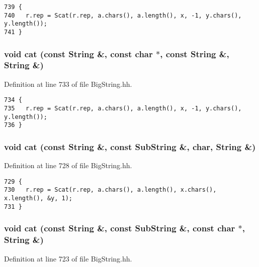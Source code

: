 \footnotesize\begin{verbatim}739 {
740   r.rep = Scat(r.rep, a.chars(), a.length(), x, -1, y.chars(), y.length());
741 }
\end{verbatim}\normalsize 
{}
\subsubsection{\setlength{\rightskip}{0pt plus 5cm}void cat (const String \&, const char $\ast$, const String \&, String \&)\hspace{0.3cm}{\tt  [friend]}}\label{classString_l21}




Definition at line 733 of file Big\-String.hh.



\footnotesize\begin{verbatim}734 {
735   r.rep = Scat(r.rep, a.chars(), a.length(), x, -1, y.chars(), y.length());
736 }
\end{verbatim}\normalsize 
{}
\subsubsection{\setlength{\rightskip}{0pt plus 5cm}void cat (const String \&, const {\bf Sub\-String} \&, char, String \&)\hspace{0.3cm}{\tt  [friend]}}\label{classString_l20}




Definition at line 728 of file Big\-String.hh.



\footnotesize\begin{verbatim}729 {
730   r.rep = Scat(r.rep, a.chars(), a.length(), x.chars(), x.length(), &y, 1);
731 }
\end{verbatim}\normalsize 
{}
\subsubsection{\setlength{\rightskip}{0pt plus 5cm}void cat (const String \&, const {\bf Sub\-String} \&, const char $\ast$, String \&)\hspace{0.3cm}{\tt  [friend]}}\label{classString_l19}




Definition at line 723 of file Big\-String.hh.



